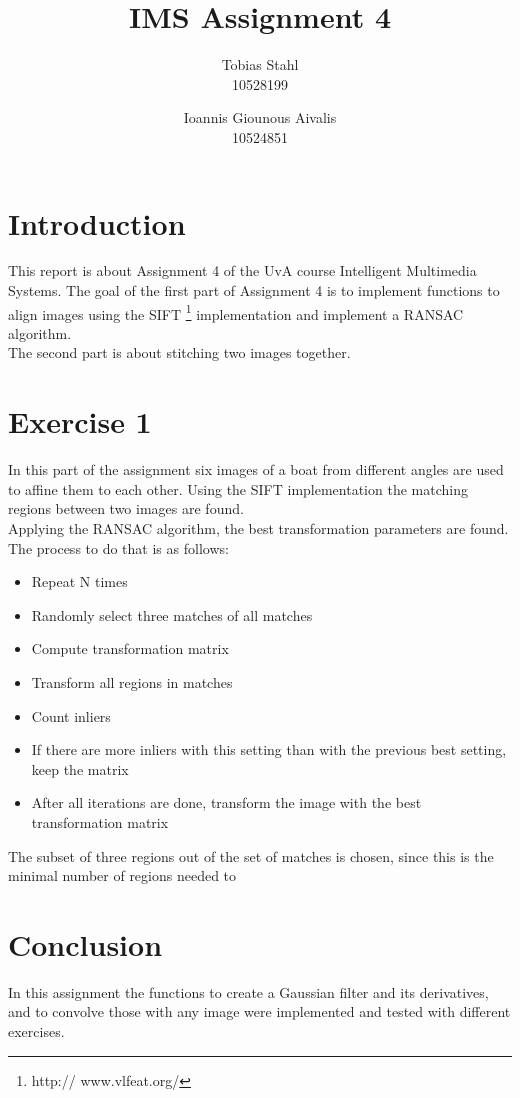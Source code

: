 \documentclass[11pt]{article}
\title{
	\textbf{IMS Assignment 4}
}
\author{Tobias Stahl \\ 10528199 \and Ioannis Giounous Aivalis \\ 10524851 }
\begin{document}
\maketitle

\section{Introduction}
This report is about Assignment 4 of the UvA course Intelligent Multimedia Systems. The goal of the first part of Assignment 4 is to implement functions to align images using the SIFT \footnote{http://
www.vlfeat.org/} implementation and implement a RANSAC algorithm.\\
The second part is about stitching two images together.

\section{Exercise 1}
In this part of the assignment six images of a boat from different angles are used to affine them to each other. Using the SIFT implementation the matching regions between two images are found.\\
Applying the RANSAC algorithm, the best transformation parameters are found. The process to do that is as follows:

\begin{itemize}
	\item 	Repeat N times
	\item	Randomly select three matches of all matches
	\item	Compute transformation matrix
	\item	Transform all regions in matches
	\item	Count inliers
	\item	If there are more inliers with this setting than with the previous best setting, keep the 			matrix
	\item	After all iterations are done, transform the image with the best transformation matrix
\end{itemize}

The subset of three regions out of the set of matches is chosen, since this is the minimal number of regions needed to 


\section{Conclusion}
In this assignment the functions to create a Gaussian filter and its derivatives, and to convolve those with any image were implemented and tested with different exercises. 
\end{document}
